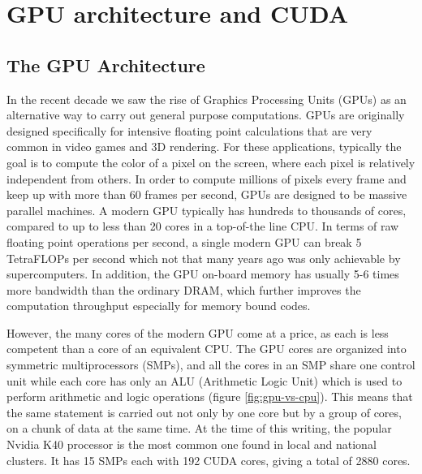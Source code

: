 
\chapter{GPU architecture and CUDA}
\label{app:gpu}


\section{The GPU Architecture}
\label{sec:gpu-arch}

In the recent decade we saw the rise of Graphics Processing Units (GPUs) as an
alternative way to carry out general purpose computations. GPUs are originally
designed specifically for intensive floating point calculations that are very
common in video games and 3D rendering. For these applications, typically the
goal is to compute the color of a pixel on the screen, where each pixel is
relatively independent from others. In order to compute millions of pixels every
frame and keep up with more than 60 frames per second, GPUs are designed to be
massive parallel machines. A modern GPU typically has hundreds to thousands of
cores, compared to up to less than 20 cores in a top-of-the line CPU. In terms
of raw floating point operations per second, a single modern GPU can break 5
TetraFLOPs per second which not that many years ago was only achievable by
supercomputers. In addition, the GPU on-board memory has usually 5-6 times more
bandwidth than the ordinary DRAM, which further improves the computation throughput
especially for memory bound codes.

However, the many cores of the modern GPU come at a price, as each is less
competent than a core of an equivalent CPU. The GPU cores are organized into
symmetric multiprocessors (SMPs), and all the cores in an SMP share one control
unit while each core has only an ALU (Arithmetic Logic Unit) which is used to
perform arithmetic and logic operations (figure \ref{fig:gpu-vs-cpu}). This
means that the same statement is carried out not only by one core but by a group
of cores, on a chunk of data at the same time. At the time of this writing, the
popular Nvidia K40 processor is the most common one found in local and national
clusters. It has 15 SMPs each with 192 CUDA cores, giving a total of 2880 cores.

